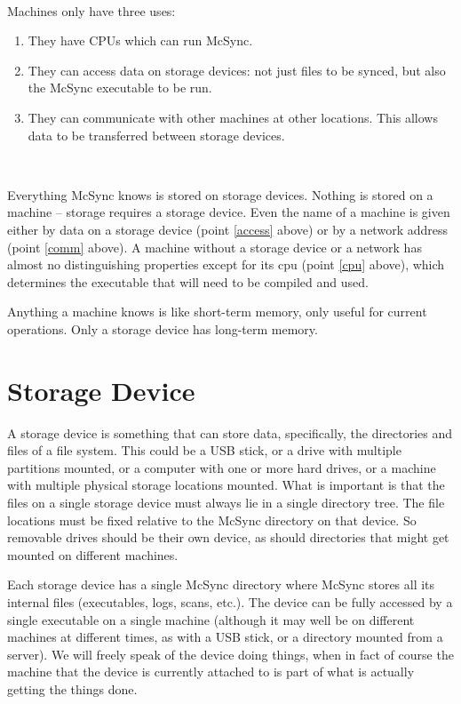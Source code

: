 \documentclass{book}
\begin{document}
~

Machines only have three uses:
\begin{enumerate}
\item They have CPUs which can run McSync.\label{cpu}
\item They can access data on storage devices: not just files to be synced, but also the McSync executable to be run.\label{access}
\item They can communicate with other machines at other locations.  This allows data to be transferred between storage devices.\label{comm}
\end{enumerate}

~

Everything McSync knows is stored on storage devices.  Nothing is stored on a machine -- storage requires a storage device.
Even the name of a machine is given either by data on a storage device (point \ref{access} above) or by a network address (point \ref{comm} above).
A machine without a storage device or a network has almost no distinguishing properties except for its cpu (point \ref{cpu} above), which determines the executable that will need to be compiled and used.

Anything a machine knows is like short-term memory, only useful for current operations.  Only a storage device has long-term memory.



\section{Storage Device}

A storage device is something that can store data, specifically, the directories and files of a file system.  This could be a USB stick, or a drive with multiple partitions mounted, or a computer with one or more hard drives, or a machine with multiple physical storage locations mounted.  What is important is that the files on a single storage device must always lie in a single directory tree.  The file locations must be fixed relative to the McSync directory on that device.  So removable drives should be their own device, as should directories that might get mounted on different machines.

Each storage device has a single McSync directory where McSync stores all its internal files (executables, logs, scans, etc.).  The device can be fully accessed by a single executable on a single machine (although it may well be on different machines at different times, as with a USB stick, or a directory mounted from a server).  We will freely speak of the device doing things, when in fact of course the machine that the device is currently attached to is part of what is actually getting the things done.
\end{document}
